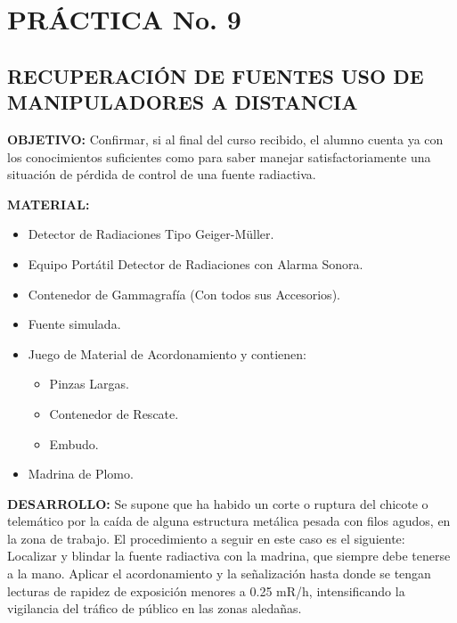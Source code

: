 \section*{PRÁCTICA No. 9}

\subsection*{RECUPERACIÓN DE FUENTES USO DE MANIPULADORES A DISTANCIA}

\textbf{OBJETIVO:} Confirmar, si al final del curso recibido, el alumno cuenta ya con los conocimientos suficientes como para saber manejar satisfactoriamente una situación de pérdida de control de una fuente radiactiva.

\textbf{MATERIAL:}
\begin{itemize}
    \item Detector de Radiaciones Tipo Geiger-Müller.
    \item Equipo Portátil Detector de Radiaciones con Alarma Sonora.
    \item Contenedor de Gammagrafía (Con todos sus Accesorios).
    \item Fuente simulada.
    \item Juego de Material de Acordonamiento y contienen:
    \begin{itemize}
        \item Pinzas Largas.
        \item Contenedor de Rescate.
        \item Embudo.
    \end{itemize}
    \item Madrina de Plomo.
\end{itemize}

\textbf{DESARROLLO:} Se supone que ha habido un corte o ruptura del chicote o telemático por la caída de alguna estructura metálica pesada con filos agudos, en la zona de trabajo.
El procedimiento a seguir en este caso es el siguiente:
Localizar y blindar la fuente radiactiva con la madrina, que siempre debe tenerse a la mano.
Aplicar el acordonamiento y la señalización hasta donde se tengan lecturas de rapidez de exposición menores a 0.25 mR/h, intensificando la vigilancia del tráfico de público en las zonas aledañas.